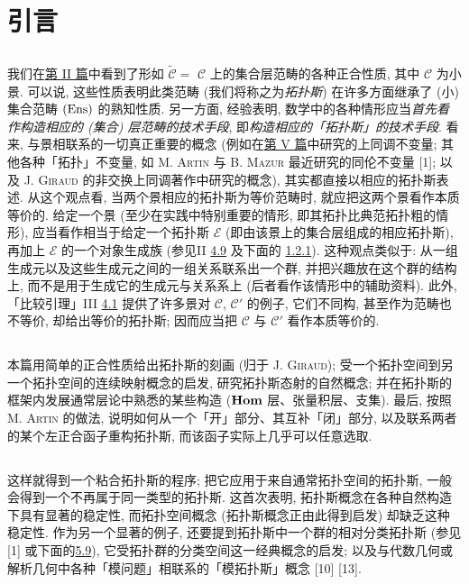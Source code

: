 \setcounter{pageoriginal}{298}
\setcounter{section}{-1}
\section{引言}\pageoriginale

\subsection{}
我们在\hyperref[sga4.exp.II]{第 II 篇}中看到了形如 $\widetilde{𝒞}=$ $𝒞$ 上的集合层范畴的各种正合性质, 其中 $𝒞$ 为小景. 可以说, 这些性质表明此类范畴 (我们将称之为\emph{拓扑斯}) 在许多方面继承了 (小) 集合范畴 $(\operatorname{Ens})$ 的熟知性质. 另一方面, 经验表明, 数学中的各种情形应当\emph{首先看作构造相应的 (集合) 层范畴的技术手段}, 即\emph{构造相应的「拓扑斯」的技术手段}. 看来, 与景相联系的一切真正重要的概念 (例如在\hyperref[sga4.exp.V]{第 V 篇}中研究的上同调不变量; 其他各种「拓扑」不变量, 如 M. \textsc{Artin} 与 B. \textsc{Mazur} 最近研究的同伦不变量 [1]; 以及 J. \textsc{Giraud} 的非交换上同调著作中研究的概念), 其实都直接以相应的拓扑斯表述. 从这个观点看, 当两个景相应的拓扑斯为等价范畴时, 就应把这两个景看作本质等价的. 给定一个景 (至少在实践中特别重要的情形, 即其拓扑比典范拓扑粗的情形), 应当看作相当于给定一个拓扑斯 $ℰ$ (即由该景上的集合层组成的相应拓扑斯), 再加上 $ℰ$ 的一个对象生成族 (参见\pageoriginale II \hyperref[II.subsec4.9]{4.9} 及下面的 \hyperref[IV.cor1.2.1]{1.2.1}). 这种观点类似于: 从一组生成元以及这些生成元之间的一组关系联系出一个群, 并把兴趣放在这个群的结构上, 而不是用于生成它的生成元与关系系上 (后者看作该情形中的辅助资料). 此外, 「比较引理」III \hyperref[III.theo4.1]{4.1} 提供了许多景对 $𝒞$, $𝒞'$ 的例子, 它们不同构, 甚至作为范畴也不等价, 却给出等价的拓扑斯; 因而应当把 $𝒞$ 与 $𝒞'$ 看作本质等价的.

\subsection{}
本篇用简单的正合性质给出拓扑斯的刻画 (归于 J. \textsc{Giraud}); 受一个拓扑空间到另一个拓扑空间的连续映射概念的启发, 研究拓扑斯态射的自然概念; 并在拓扑斯的框架内发展通常层论中熟悉的某些构造 ($\operatorname{\mathbf{Hom}}$ 层、张量积层、支集). 最后, 按照 M. \textsc{Artin} 的做法, 说明如何从一个「开」部分、其互补「闭」部分, 以及联系两者的某个左正合函子重构拓扑斯, 而该函子实际上几乎可以任意选取.

\subsection{}
这样就得到一个粘合拓扑斯的程序; 把它应用于来自通常拓扑空间的拓扑斯, 一般会得到一个不再属于同一类型的拓扑斯. 这首次表明, 拓扑斯概念在各种自然构造下具有显著的稳定性, 而拓扑空间概念 (拓扑斯概念正由此\pageoriginale 得到启发) 却缺乏这种稳定性. 作为另一个显著的例子, 还要提到拓扑斯中一个群的相对分类拓扑斯 (参见 [1] 或下面的\hyperref[IV.exer5.9]{5.9}), 它受拓扑群的分类空间这一经典概念的启发; 以及与代数几何或解析几何中各种「模问题」相联系的「模拓扑斯」概念 [10] [13].

